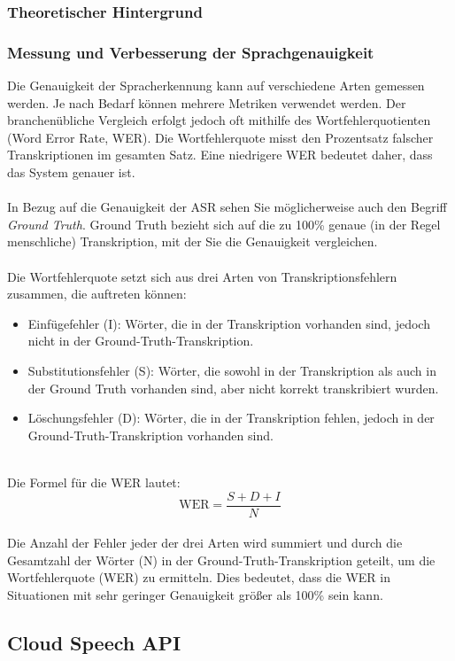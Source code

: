 \documentclass[12pt,a4paper]{article}
\begin{document}
\subsubsection{Theoretischer Hintergrund}
\newpage
\subsubsection{Messung und Verbesserung der Sprachgenauigkeit}
Die Genauigkeit der Spracherkennung kann auf verschiedene Arten gemessen werden. Je nach Bedarf können mehrere Metriken verwendet werden. Der branchenübliche Vergleich erfolgt jedoch oft mithilfe des Wortfehlerquotienten (Word Error Rate, WER). Die Wortfehlerquote misst den Prozentsatz falscher Transkriptionen im gesamten Satz. Eine niedrigere WER bedeutet daher, dass das System genauer ist.
\\ \\
In Bezug auf die Genauigkeit der ASR sehen Sie möglicherweise auch den Begriff \textit{Ground Truth}. Ground Truth bezieht sich auf die zu 100\% genaue (in der Regel menschliche) Transkription, mit der Sie die Genauigkeit vergleichen.
\\ \\
Die Wortfehlerquote setzt sich aus drei Arten von Transkriptionsfehlern zusammen, die auftreten können:

\begin{itemize}
	\item Einfügefehler (I): Wörter, die in der Transkription vorhanden sind, jedoch nicht in der Ground-Truth-Transkription.
	\item Substitutionsfehler (S): Wörter, die sowohl in der Transkription als auch in der Ground Truth vorhanden sind, aber nicht korrekt transkribiert wurden.
	\item Löschungsfehler (D): Wörter, die in der Transkription fehlen, jedoch in der Ground-Truth-Transkription vorhanden sind.
\end{itemize}
\ \\
Die Formel für die WER lautet: 
\[ \text{WER} = \frac{S + D + I}{N} \]
\\
Die Anzahl der Fehler jeder der drei Arten wird summiert und durch die Gesamtzahl der Wörter (N) in der Ground-Truth-Transkription geteilt, um die Wortfehlerquote (WER) zu ermitteln. Dies bedeutet, dass die WER in Situationen mit sehr geringer Genauigkeit größer als 100\% sein kann.
\newpage
\subsection{Cloud Speech API}
\end{document}
